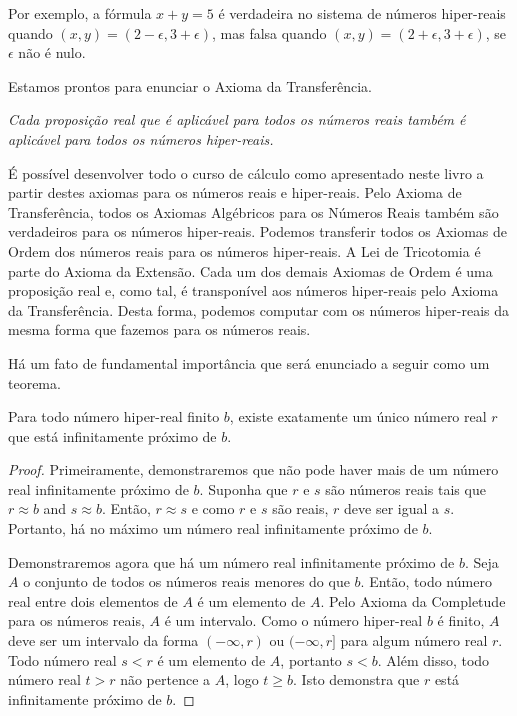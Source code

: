 Por exemplo, a fórmula $x + y = 5$ é verdadeira no sistema de números
hiper-reais quando $(x, y) = (2 - \epsilon, 3 + \epsilon)$, mas falsa
quando $(x, y) = (2+\epsilon, 3 + \epsilon)$, se $\epsilon$ não é nulo.

Estamos prontos para enunciar o Axioma da Transferência.


\emph{Cada proposição real que é aplicável para todos os números reais
também é aplicável para todos os números hiper-reais.}

É possível desenvolver todo o curso de cálculo como apresentado neste
livro a partir destes axiomas para os números reais e hiper-reais. Pelo
Axioma de Transferência, todos os Axiomas Algébricos para os Números
Reais também são verdadeiros para os números hiper-reais. Podemos
transferir todos os Axiomas de Ordem dos números reais para os números
hiper-reais. A Lei de Tricotomia é parte do Axioma da Extensão. Cada um
dos demais Axiomas de Ordem é uma proposição real e, como tal, é
transponível aos números hiper-reais pelo Axioma da Transferência. Desta
forma, podemos computar com os números hiper-reais da mesma forma que
fazemos para os números reais.

Há um fato de fundamental importância que será enunciado a seguir como
um teorema.

\begin{theor}
Para todo número hiper-real finito $b$, existe exatamente um único
número real $r$ que está infinitamente próximo de $b$.
\end{theor}

\begin{proof}
Primeiramente, demonstraremos que não pode haver mais de um número real
infinitamente próximo de $b$. Suponha que $r$ e $s$ são números reais
tais que $r \approx b$ and $s \approx b$. Então, $r \approx s$ e como
$r$ e $s$ são reais, $r$ deve ser igual a $s$. Portanto, há no máximo
um número real infinitamente próximo de $b$.

Demonstraremos agora que há um número real infinitamente próximo de $b$.
Seja $A$ o conjunto de todos os números reais menores do que $b$. Então,
todo número real entre dois elementos de $A$ é um elemento de $A$. Pelo
Axioma da Completude para os números reais, $A$ é um intervalo. Como o
número hiper-real $b$ é finito, $A$ deve ser um intervalo da forma
$(-\infty, r)$ ou $(-\infty, r]$ para algum número real $r$. Todo número
real $s < r$ é um elemento de $A$, portanto $s < b$. Além disso, todo
número real $t > r$ não pertence a $A$, logo $t \ge b$. Isto demonstra
que $r$ está infinitamente próximo de $b$.
\end{proof}

